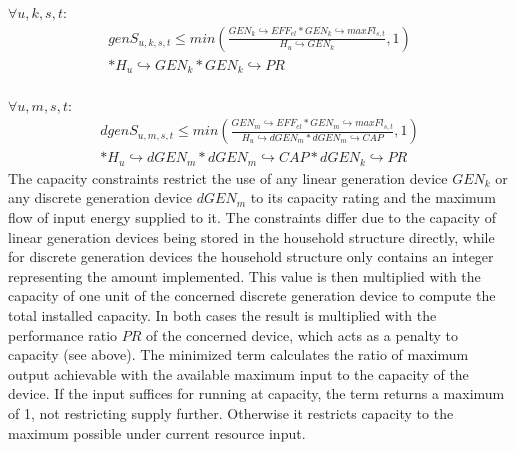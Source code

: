 \documentclass[
	11pt,								%
	DIV10,								%
	a4paper,         					%
	oneside,							%
	headheight=20pt,					%
	footheight=20pt,					%
    parskip=full,						%
    listof=totoc,						%
	bibliography=totoc,					%
	index=totoc,						%
]{scrartcl}
\begin{document}
	$\forall u,k,s,t$:
	\begin{equation}
		\begin{split}
		genS_{u,k,s,t} \leq min(\frac{GEN_k \hookrightarrow EFF_{el} * GEN_k \hookrightarrow maxFl_{s,t}}{H_u\hookrightarrow  GEN_k}, 1) \\ * H_u\hookrightarrow  GEN_k * GEN_k \hookrightarrow PR
		\end{split}
	\end{equation}
	\\
	$\forall u,m,s,t$:
	\begin{equation}
		\begin{split}
		dgenS_{u,m,s,t} \leq min(\frac{GEN_m \hookrightarrow EFF_{el} * GEN_m \hookrightarrow maxFl_{s,t}}{H_u \hookrightarrow  dGEN_m * dGEN_m \hookrightarrow CAP }, 1) \\ * H_u\hookrightarrow  dGEN_m * dGEN_m \hookrightarrow CAP * dGEN_k \hookrightarrow PR
		\end{split}
	\end{equation}
	The capacity constraints restrict the use of any linear generation device $GEN_k$ or any discrete generation device $dGEN_m$ to its capacity rating and the maximum flow of input energy supplied to it.
	The constraints differ due to the capacity of linear generation devices being stored in the household structure directly, while for discrete generation devices the household structure only contains an integer representing the amount implemented. This value is then multiplied with the capacity of one unit of the concerned discrete generation device to compute the total installed capacity. In both cases the result is multiplied with the performance ratio $PR$ of the concerned device, which acts as a penalty to capacity (see above). The minimized term calculates the ratio of maximum output achievable with the available maximum input to the capacity of the device. If the input suffices for running at capacity, the term returns a maximum of 1, not restricting supply further. Otherwise it restricts capacity to the maximum possible under current resource input.

	
\end{document}
